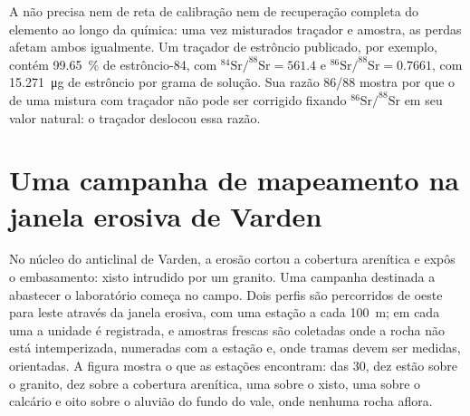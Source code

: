 A  não precisa nem de reta de calibração nem de recuperação completa do elemento ao longo
da química: uma vez misturados traçador e amostra, as perdas afetam ambos igualmente. Um traçador de estrôncio
publicado, por exemplo, contém \qty{99.65}{\percent} de estrôncio-84, com
$^{84}\mathrm{Sr}/^{88}\mathrm{Sr} = 561.4$ e $^{86}\mathrm{Sr}/^{88}\mathrm{Sr} = 0.7661$, com
\qty{15.271}{\micro\gram} de estrôncio por grama de solução. Sua razão 86/88 mostra por que o  de uma mistura com traçador não pode ser corrigido fixando $^{86}\mathrm{Sr}/^{88}\mathrm{Sr}$ em seu
valor natural: o traçador deslocou essa razão.

\section{Uma campanha de mapeamento na janela erosiva de Varden}\label{sec:b2:field-lab-methods-2:campaign}

No núcleo do anticlinal de Varden, a erosão cortou a cobertura arenítica e expôs o
embasamento: xisto intrudido por um granito. Uma campanha destinada a abastecer o laboratório começa no
campo. Dois perfis são percorridos de oeste para leste através da janela erosiva, com uma estação a cada
\qty{100}{m}; em cada uma a unidade é registrada, e amostras frescas são coletadas onde a rocha não está
intemperizada, numeradas com a estação e, onde tramas devem ser medidas, orientadas. A figura
mostra o que as estações encontram: das 30, dez estão sobre o granito, dez sobre a cobertura arenítica, uma sobre
o xisto, uma sobre o calcário e oito sobre o aluvião do fundo do vale, onde nenhuma rocha
aflora.

